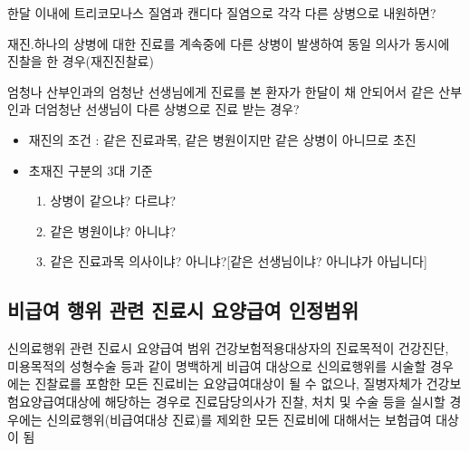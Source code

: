 한달 이내에 트리코모나스 질염과 캔디다 질염으로 각각 다른 상병으로 내원하면? 
\begin{quotebox}
재진.하나의 상병에 대한 진료를 계속중에 다른 상병이 발생하여 동일 의사가 동시에 진찰을 한 경우(재진진찰료)
\end{quotebox}

엄청나 산부인과의 엄청난 선생님에게 진료를 본 환자가 한달이 채 안되어서 같은 산부인과 더엄청난 선생님이 다른 상병으로 진료 받는 경우?
\begin{commentbox}{}
\begin{itemize}\tightlist
\item 재진의 조건 : 같은 진료과목, 같은 병원이지만 같은 상병이 아니므로 초진
\item 초재진 구분의 3대 기준 
	\begin{enumerate}\tightlist
	\item 상병이 같으냐? 다르냐?
	\item 같은 병원이냐? 아니냐?
	\item 같은 진료과목 의사이냐? 아니냐?[같은 선생님이냐? 아니냐가 아닙니다]
	\end{enumerate}
\end{itemize}
\end{commentbox}

\subsection{비급여 행위 관련 진료시 요양급여 인정범위}
\begin{commentbox}{신의료행위 관련 진료시 요양급여 범위}
건강보험적용대상자의 진료목적이 건강진단, 미용목적의 성형수술 등과 같이 명백하게 비급여 대상으로 신의료행위를 시술할 경우에는 진찰료를 포함한 모든 진료비는 요양급여대상이 될 수 없으나, 질병자체가 건강보험요양급여대상에 해당하는 경우로 진료담당의사가 진찰, 처치 및 수술 등을 실시할 경우에는 신의료행위(비급여대상 진료)를 제외한 모든 진료비에 대해서는 보험급여 대상이 됨
\end{commentbox}
